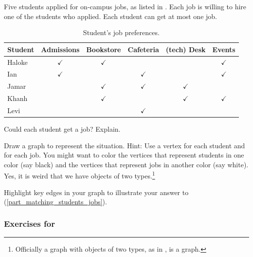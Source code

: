 \begin{exer}[\exerE] %
\label{exer_matching_students_jobs} 

Five students applied for on-campus jobs, as listed in . Each job is willing to hire one of the students who applied.  Each student can get at most one job.
    \begin{table}[ht]
    \centering
        \begin{tabular} { l| c| c| c| c| c}
            Student & Admissions & Bookstore & Cafeteria & (tech) Desk & Events \\ \hline
            Haloke & $\checkmark$ & $\checkmark$ &  & & $\checkmark$ \\ \hline
            Ian & $\checkmark$ & & $\checkmark$ & & $\checkmark$ \\ \hline
            Jamar & & $\checkmark$ & $\checkmark$ & $\checkmark$ & \\ \hline
            Khanh & & $\checkmark$ & & $\checkmark$ & $\checkmark$ \\ \hline
            Levi & & & $\checkmark$ & &  
        \end{tabular}
        \caption{Student's job preferences.}
        \label{table_matching_students_jobs}
    \end{table}

    \begin{exerpart}
        \item \label{part_matching_students_jobs} Could each student get a job? Explain.
        \item Draw a graph to represent the situation.  Hint: Use a vertex for each student and for each job.  You might want to color the vertices that represent students in one color (say black) and the vertices that represent jobs in another color (say white).  Yes, it is weird that we have objects of two types.\footnote{Officially a graph with objects of two types, as in , is a  graph.}
        \item Highlight key edges in your graph to illustrate your answer to (\ref{part_matching_students_jobs}).
    \end{exerpart}
\end{exer}


\subsubsection*{Exercises for  \subgraphcomp}

